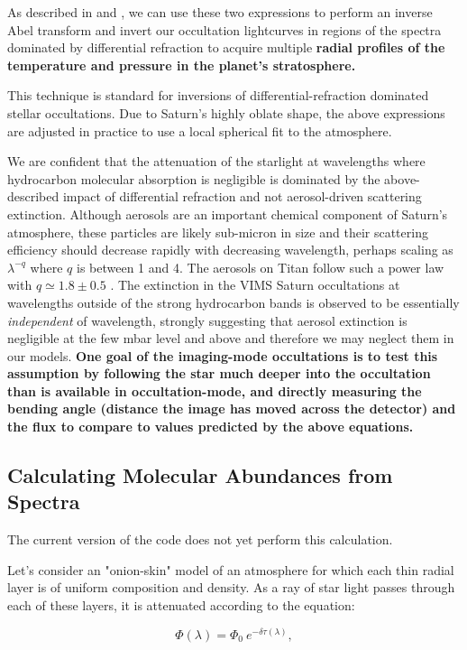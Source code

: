 \documentclass[12pt]{article}
\begin{document}
As described in \cite{Elliot77} and \cite{French78}, we can use these two
expressions to perform an inverse Abel transform and invert our occultation
lightcurves in regions of the spectra dominated by differential refraction to
acquire multiple {\bf radial profiles of the temperature and pressure in the
planet's stratosphere.}

This technique is standard for inversions of differential-refraction dominated
stellar occultations.  Due to Saturn's highly oblate shape, the above
expressions are adjusted in practice to use a local spherical fit to the
atmosphere.

We are confident that the attenuation of the starlight at wavelengths where
hydrocarbon molecular absorption is negligible is dominated by the
above-described impact of differential refraction and not aerosol-driven
scattering extinction. Although aerosols are an important chemical component of
Saturn's atmosphere, these particles are likely sub-micron in size and their
scattering efficiency should decrease rapidly with decreasing wavelength,
perhaps scaling as $\lambda^{-q}$ where $q$ is between 1 and 4. The aerosols on
Titan follow such a power law with $q\simeq1.8\pm0.5$ \citep{Bellucci09}. The
extinction in the VIMS Saturn occultations at wavelengths outside of the strong
hydrocarbon bands is observed to be essentially {\sl independent} of
wavelength, strongly suggesting that aerosol extinction is negligible at the
few mbar level and above and therefore we may neglect them in our models. {\bf
One goal of the imaging-mode occultations is to test this assumption by
following the star much deeper into the occultation than is available in
occultation-mode, and directly measuring the bending angle (distance the image
has moved across the detector) and the flux to compare to values predicted by
the above equations.}

\subsection{Calculating Molecular Abundances from Spectra}

The current version of the code does not yet perform this calculation.

Let's consider an "onion-skin" model of an atmosphere for which each thin
radial layer is of uniform composition and density. As a ray of star light
passes through each of these layers, it is attenuated according to the
equation:

\begin{equation}
\Phi(\lambda) = \Phi_0\ e^{-\delta\tau(\lambda)},
\label{eq:abs_flux}
\end{equation}
\end{document}
